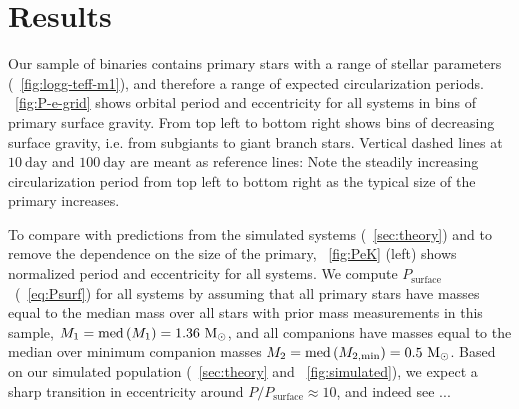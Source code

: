 \documentclass[modern, letterpaper]{aastex62}
\newcommand{\med}[1]{\ensuremath{\textrm{med}\left(#1\right)}}
\newcommand{\Psurf}{\ensuremath{P_\textrm{surface}}}
\begin{document}
\section{Results}
\label{sec:results}

Our sample of binaries contains primary stars with a range of stellar parameters
(\figurename~\ref{fig:logg-teff-m1}), and therefore a range of expected
circularization periods.
\figurename~\ref{fig:P-e-grid} shows orbital period and eccentricity for all
systems in bins of primary surface gravity.
From top left to bottom right shows bins of decreasing surface gravity, i.e.
from subgiants to giant branch stars.
Vertical dashed lines at $10~\textrm{day}$ and $100~\textrm{day}$ are meant as
reference lines: Note the steadily increasing circularization period from top
left to bottom right as the typical size of the primary increases.

To compare with predictions from the simulated systems
(\sectionname~\ref{sec:theory}) and to remove the dependence on the size of
the primary, \figurename~\ref{fig:PeK} (left) shows normalized period and
eccentricity for all systems.
We compute \Psurf\ (\eqname~\ref{eq:Psurf}) for all systems by assuming that all
primary stars have masses equal to the median mass over all stars with prior
mass measurements in this sample, $M_1 = \med{M_1} = 1.36~\msun$, and all
companions have masses equal to the median over minimum companion masses $M_2 =
\med{M_{2, \textrm{min}}} = 0.5~\msun$.
Based on our simulated population (\sectionname~\ref{sec:theory} and
\figurename~\ref{fig:simulated}), we expect a sharp transition in eccentricity
around $P/\Psurf \approx 10$, and indeed see ...
\end{document}
